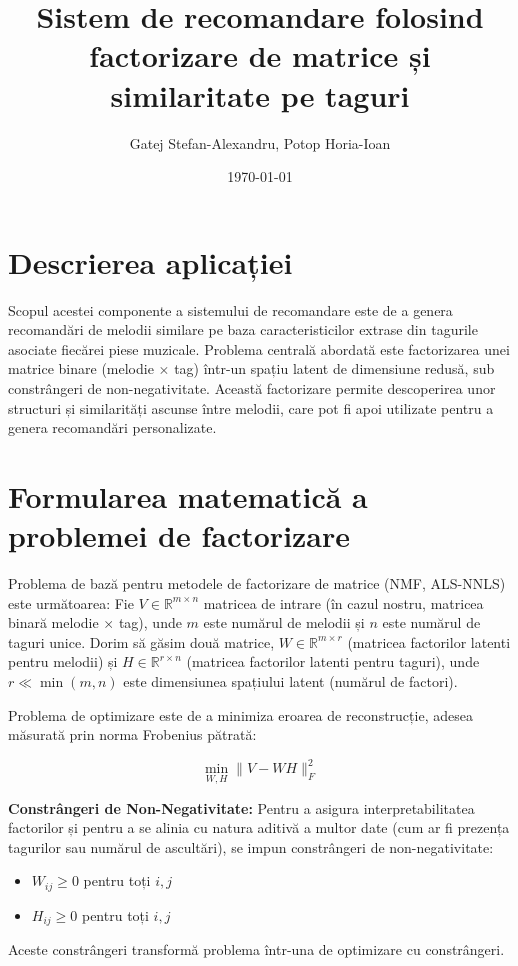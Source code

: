 \documentclass[12pt,a4paper]{article}
\title{Sistem de recomandare folosind factorizare de matrice și similaritate pe taguri}
\author{Gatej Stefan-Alexandru, Potop Horia-Ioan}
\date{\today} %
\begin{document}
	
	\maketitle
	\tableofcontents
	\newpage
	
	\section{Descrierea aplicației}
	
	Scopul acestei componente a sistemului de recomandare este de a genera recomandări de melodii similare pe baza caracteristicilor extrase din tagurile asociate fiecărei piese muzicale. Problema centrală abordată este factorizarea unei matrice binare (melodie $\times$ tag) într-un spațiu latent de dimensiune redusă, sub constrângeri de non-negativitate. Această factorizare permite descoperirea unor structuri și similarități ascunse între melodii, care pot fi apoi utilizate pentru a genera recomandări personalizate.
	
	\section{Formularea matematică a problemei de factorizare}
	
	Problema de bază pentru metodele de factorizare de matrice (NMF, ALS-NNLS) este următoarea:
	Fie $V \in \mathbb{R}^{m \times n}$ matricea de intrare (în cazul nostru, matricea binară melodie $\times$ tag), unde $m$ este numărul de melodii și $n$ este numărul de taguri unice. Dorim să găsim două matrice, $W \in \mathbb{R}^{m \times r}$ (matricea factorilor latenti pentru melodii) și $H \in \mathbb{R}^{r \times n}$ (matricea factorilor latenti pentru taguri), unde $r \ll \min(m,n)$ este dimensiunea spațiului latent (numărul de factori).
	
	Problema de optimizare este de a minimiza eroarea de reconstrucție, adesea măsurată prin norma Frobenius pătrată:
	
	\begin{equation}
		\min_{W, H} \| V - W H \|_F^2
		\label{eq:nmf_objective_main}
	\end{equation}
	
	\textbf{Constrângeri de Non-Negativitate:}
	Pentru a asigura interpretabilitatea factorilor și pentru a se alinia cu natura aditivă a multor date (cum ar fi prezența tagurilor sau numărul de ascultări), se impun constrângeri de non-negativitate:
	\begin{itemize}
		\item $W_{ij} \geq 0$ pentru toți $i,j$
		\item $H_{ij} \geq 0$ pentru toți $i,j$
	\end{itemize}
	Aceste constrângeri transformă problema într-una de optimizare cu constrângeri.
	
\end{document}
